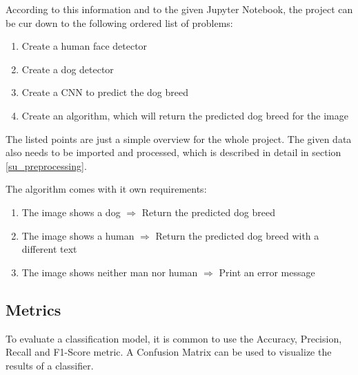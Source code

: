 \documentclass{article}
\begin{document}
According to this information and to the given Jupyter Notebook, the project can be cur down to the following ordered list of problems:
\begin{enumerate}
	\item Create a human face detector
	\item Create a dog detector
	\item Create a CNN to predict the dog breed
	\item Create an algorithm, which will return the predicted dog breed for the image
\end{enumerate}
The listed points are just a simple overview for the whole project. The given data also needs to be imported and processed, which is described in detail in section \ref{su_preprocessing}.\newline

The algorithm comes with it own requirements:
\begin{enumerate}
	\item The image shows a dog \(\Rightarrow\) Return the predicted dog breed
	\item The image shows a human \(\Rightarrow\)  Return the predicted dog breed with a different text
	\item The image shows neither man nor human \(\Rightarrow\)  Print an error message
\end{enumerate}

\subsection{Metrics} \label{su_metrics}
To evaluate a classification model, it is common to use the Accuracy, Precision, Recall and F1-Score metric. A Confusion Matrix can be used to visualize the results of a classifier.\newline
\end{document}
